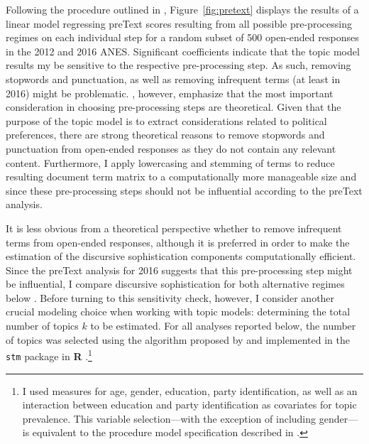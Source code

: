 Following the procedure outlined in \citet{denny2018text}, Figure~\ref{fig:pretext} displays the results of a linear model regressing preText scores resulting from all possible pre-processing regimes on each individual step for a random subset of 500 open-ended responses in the 2012 and 2016 ANES. Significant coefficients indicate that the topic model results my be sensitive to the respective pre-processing step. As such, removing stopwords and punctuation, as well as removing infrequent terms (at least in 2016) might be problematic. \citet{denny2018text}, however, emphasize that the most important consideration in choosing pre-processing steps are theoretical. Given that the purpose of the topic model is to extract considerations related to political preferences, there are strong theoretical reasons to remove stopwords and punctuation from open-ended responses as they do not contain any relevant content. Furthermore, I apply lowercasing and stemming of terms to reduce resulting document term matrix to a computationally more manageable size and since these pre-processing steps should not be influential according to the preText analysis.

It is less obvious from a theoretical perspective whether to remove infrequent terms from open-ended responses, although it is preferred in order to make the estimation of the discursive sophistication components computationally efficient. Since the preText analysis for 2016 suggests that this pre-processing step might be influential, I compare discursive sophistication for both alternative regimes below \citep[c.f.,][]{denny2018text}. Before turning to this sensitivity check, however, I consider another crucial modeling choice when working with topic models: determining the total number of topics $k$ to be estimated. For all analyses reported below, the number of topics was selected using the algorithm proposed by \citet{lee2014low} and implemented in the \texttt{stm} package in \textbf{R} \citep{roberts2014stm}.\footnote{I used measures for age, gender, education, party identification, as well as an interaction between education and party identification as covariates for topic prevalence. This variable selection---with the exception of including gender---is equivalent to the procedure model specification described in \citet{roberts2014structural}.} 

